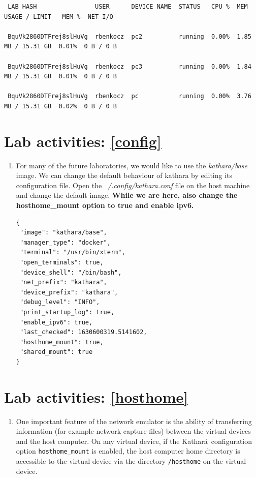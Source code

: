 \documentclass[12pt]{book}
\newcommand{\kathara}{Kathar\'a}
\begin{document}
\begin{enumerate}[label=\arabic*.]
\begin{enumerate}[resume*]
\begin{lstlisting}
 LAB HASH                USER      DEVICE NAME  STATUS   CPU %  MEM USAGE / LIMIT   MEM %  NET I/O   

 BquVk2860DTFrej8slHuVg  rbenkocz  pc2          running  0.00%  1.85 MB / 15.31 GB  0.01%  0 B / 0 B 

 BquVk2860DTFrej8slHuVg  rbenkocz  pc3          running  0.00%  1.84 MB / 15.31 GB  0.01%  0 B / 0 B 

 BquVk2860DTFrej8slHuVg  rbenkocz  pc           running  0.00%  3.76 MB / 15.31 GB  0.02%  0 B / 0 B 

\end{lstlisting}

\end{enumerate}

\section{Lab activities: \ref{config}}

\begin{enumerate}[resume*]
\item For many of the future laboratories, we would like to use the \emph{kathara/base} image. We can change the default behaviour of kathara by editing its configuration file. Open the \emph{~/.config/kathara.conf} file on the host machine and change the default image. \textbf{While we are here, also change the hosthome\_mount option to true and enable ipv6.}
\begin{lstlisting}
{
 "image": "kathara/base",
 "manager_type": "docker",
 "terminal": "/usr/bin/xterm",
 "open_terminals": true,
 "device_shell": "/bin/bash",
 "net_prefix": "kathara",
 "device_prefix": "kathara",
 "debug_level": "INFO",
 "print_startup_log": true,
 "enable_ipv6": true,
 "last_checked": 1630600319.5141602,
 "hosthome_mount": true,
 "shared_mount": true
}
\end{lstlisting}
\end{enumerate}

\section{Lab activities: \ref{hosthome}}

\begin{enumerate}[resume*]
\item One important feature of the network emulator is the ability of transferring information (for example network capture files) between the virtual devices and the host computer. On any virtual device, if the \kathara\ configuration option \verb$hosthome_mount$ is enabled, the host computer home directory is accessible to the virtual device via the directory \verb$/hosthome$ on the virtual device.


\end{enumerate}
\end{enumerate}
\end{document}
